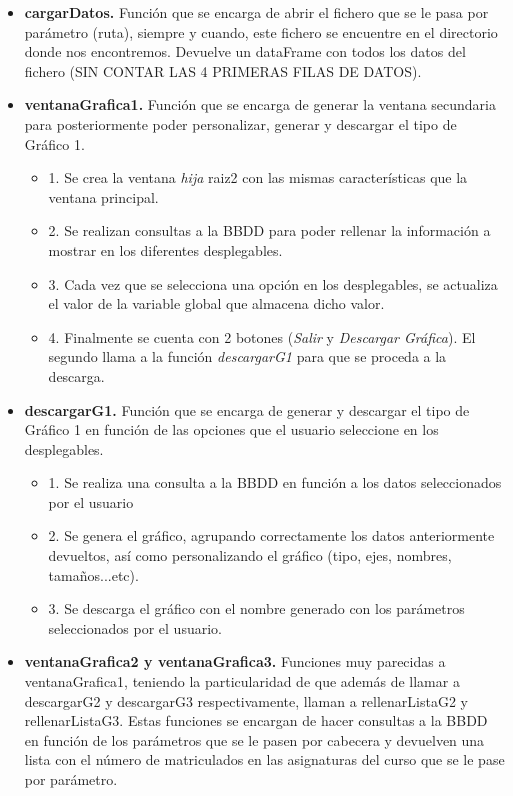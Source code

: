 \begin{itemize}
\item \textbf{cargarDatos.} Función que se encarga de abrir el fichero que se le pasa por parámetro (ruta), siempre y cuando, este fichero se encuentre en el directorio donde nos encontremos. Devuelve un dataFrame con todos los datos del fichero (SIN CONTAR LAS 4 PRIMERAS FILAS DE DATOS).

\item \textbf{ventanaGrafica1.} Función que se encarga de generar la ventana secundaria para posteriormente poder personalizar, generar y descargar el tipo de Gráfico 1.
	\begin{itemize}
    \item 1. Se crea la ventana \emph{hija} raiz2 con las mismas características que la ventana principal.
    \item 2. Se realizan consultas a la BBDD para poder rellenar la información a mostrar en los diferentes desplegables.
    \item 3. Cada vez que se selecciona una opción en los desplegables, se actualiza el valor de la variable global que almacena dicho valor.
    \item 4. Finalmente se cuenta con 2 botones (\emph{Salir} y \emph{Descargar Gráfica}). El segundo llama a la función \emph{descargarG1} para que se proceda a la descarga.
	\end{itemize}
	

\item \textbf{descargarG1.} Función que se encarga de generar y descargar el tipo de Gráfico 1 en función de las opciones que el usuario seleccione en los desplegables.
	\begin{itemize}
    \item 1. Se realiza una consulta a la BBDD en función a los datos seleccionados por el usuario 
    \item 2. Se genera el gráfico, agrupando correctamente los datos anteriormente devueltos, así como personalizando el gráfico (tipo, ejes, nombres, tamaños...etc).
    \item 3. Se descarga el gráfico con el nombre generado con los parámetros seleccionados por el usuario.
	\end{itemize}


\item \textbf{ventanaGrafica2 y ventanaGrafica3.} Funciones muy parecidas a ventanaGrafica1, teniendo la particularidad de que además de llamar a descargarG2 y descargarG3 respectivamente, llaman a rellenarListaG2 y rellenarListaG3. Estas funciones se encargan de hacer consultas a la BBDD en función de los parámetros que se le pasen por cabecera y devuelven una lista con el número de matriculados en las asignaturas del curso que se le pase por parámetro.


\end{itemize}
